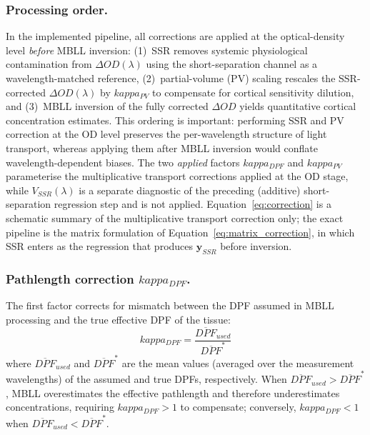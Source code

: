 \documentclass[11pt]{article}
\def\kappa{kappa}%
\def\mathrm#1{#1}%
\begin{document}
\subsubsection{Processing order.}

In the implemented pipeline, all corrections are applied at the optical-density level \emph{before} MBLL inversion: (1)~SSR removes systemic physiological contamination from $\Delta\mathrm{OD}(\lambda)$ using the short-separation channel as a wavelength-matched reference, (2)~partial-volume (PV) scaling rescales the SSR-corrected $\Delta\mathrm{OD}(\lambda)$ by $\kappa_{\mathrm{PV}}$ to compensate for cortical sensitivity dilution, and (3)~MBLL inversion of the fully corrected $\Delta\mathrm{OD}$ yields quantitative cortical concentration estimates. This ordering is important: performing SSR and PV correction at the OD level preserves the per-wavelength structure of light transport, whereas applying them after MBLL inversion would conflate wavelength-dependent biases. The two \emph{applied} factors $\kappa_{\mathrm{DPF}}$ and $\kappa_{\mathrm{PV}}$ parameterise the multiplicative transport corrections applied at the OD stage, while $V_{\mathrm{SSR}}(\lambda)$ is a separate diagnostic of the preceding (additive) short-separation regression step and is not applied. Equation~\eqref{eq:correction} is a schematic summary of the multiplicative transport correction only; the exact pipeline is the matrix formulation of Equation~\eqref{eq:matrix_correction}, in which SSR enters as the regression that produces $\mathbf{y}_{\mathrm{SSR}}$ before inversion.

\subsubsection{Pathlength correction \texorpdfstring{$\kappa_{\mathrm{DPF}}$}{kappa\_DPF}.}

The first factor corrects for mismatch between the DPF assumed in MBLL processing and the true effective DPF of the tissue:
\begin{equation}
\kappa_{\mathrm{DPF}} = \frac{\overline{\mathrm{DPF}}_{\mathrm{used}}}{\overline{\mathrm{DPF}}^{*}}
\label{eq:kappa_dpf}
\end{equation}
where $\overline{\mathrm{DPF}}_{\mathrm{used}}$ and $\overline{\mathrm{DPF}}^{*}$ are the mean values (averaged over the measurement wavelengths) of the assumed and true DPFs, respectively. When $\overline{\mathrm{DPF}}_{\mathrm{used}} > \overline{\mathrm{DPF}}^{*}$, MBLL overestimates the effective pathlength and therefore underestimates concentrations, requiring $\kappa_{\mathrm{DPF}} > 1$ to compensate; conversely, $\kappa_{\mathrm{DPF}} < 1$ when $\overline{\mathrm{DPF}}_{\mathrm{used}} < \overline{\mathrm{DPF}}^{*}$.
\end{document}
